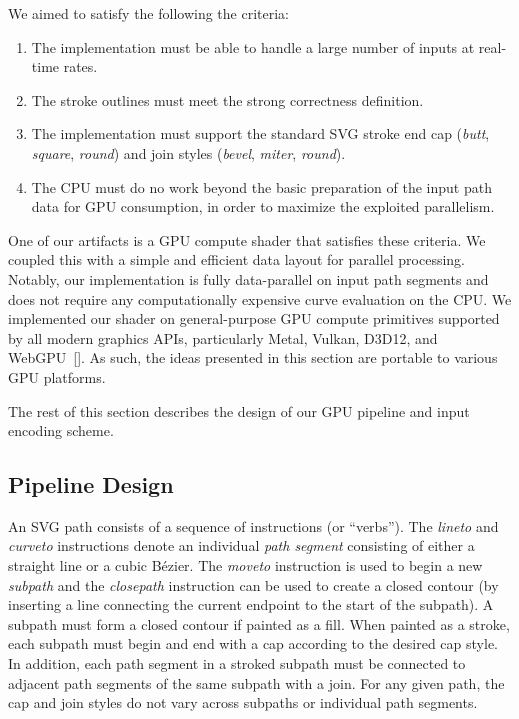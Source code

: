 \documentclass[sigconf, nonacm]{acmart}
\begin{document}
We aimed to satisfy the following the criteria:
\begin{enumerate}
  \item The implementation must be able to handle a large number of inputs at real-time rates. 
  \item The stroke outlines must meet the strong correctness definition.
  \item The implementation must support the standard SVG stroke end cap (\emph{butt}, \emph{square}, \emph{round}) and join styles (\emph{bevel}, \emph{miter}, \emph{round}).
  \item The CPU must do no work beyond the basic preparation of the input path data for GPU consumption, in order to maximize the exploited parallelism.
\end{enumerate}

One of our artifacts is a GPU compute shader that satisfies these criteria. We coupled this with a simple and efficient data layout for parallel processing. Notably, our implementation is fully data-parallel on input path segments and does not require any computationally expensive curve evaluation on the CPU. We implemented our shader on general-purpose GPU compute primitives supported by all modern graphics APIs, particularly Metal, Vulkan, D3D12, and WebGPU~[]. As such, the ideas presented in this section are portable to various GPU platforms.

The rest of this section describes the design of our GPU pipeline and input encoding scheme.

\subsection{Pipeline Design} \label{subsec:pipeline-design}

An SVG path consists of a sequence of instructions (or ``verbs''). The \emph{lineto} and \emph{curveto} instructions denote an individual \emph{path segment} consisting of either a straight line or a cubic Bézier. The \emph{moveto} instruction is used to begin a new \emph{subpath} and the \emph{closepath} instruction can be used to create a closed contour (by inserting a line connecting the current endpoint to the start of the subpath). A subpath must form a closed contour if painted as a fill. When painted as a stroke, each subpath must begin and end with a cap according to the desired cap style. In addition, each path segment in a stroked subpath must be connected to adjacent path segments of the same subpath with a join. For any given path, the cap and join styles do not vary across subpaths or individual path segments.
\end{document}
